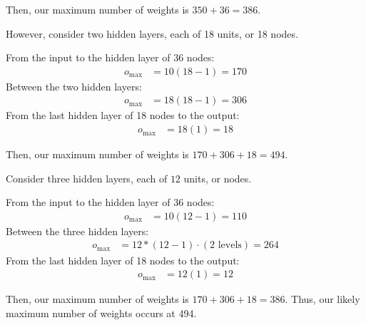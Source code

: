 \documentclass[10pt,letter]{article}
\begin{document}
	Then, our maximum number of weights is $350 + 36 = 386$.

	However, consider two hidden layers, each of 18 units, or 18 nodes.

	From the input to the hidden layer of 36 nodes:
	\begin{align*}
	o_{\text{max}} &= 10(18 - 1) = 170
	\end{align*}
	Between the two hidden layers:
	\begin{align*}
	o_{\text{max}} &= 18(18 - 1) = 306
	\end{align*}
	From the last hidden layer of 18 nodes to the output:
	\begin{align*}
	o_{\text{max}} &= 18(1) = 18
	\end{align*}

	Then, our maximum number of weights is $170 + 306 + 18 = 494$.

	Consider three hidden layers, each of $12$ units, or nodes.

	From the input to the hidden layer of 36 nodes:
	\begin{align*}
	o_{\text{max}} &= 10(12 - 1) = 110
	\end{align*}
	Between the three hidden layers:
	\begin{align*}
	o_{\text{max}} &= 12*(12-1) \cdot (2 \text{ levels}) = 264
	\end{align*}
	From the last hidden layer of 18 nodes to the output:
	\begin{align*}
	o_{\text{max}} &= 12(1) = 12
	\end{align*}

	Then, our maximum number of weights is $170 + 306 + 18 = 386$. Thus, our likely maximum number of weights occurs at 494.
\end{document}
